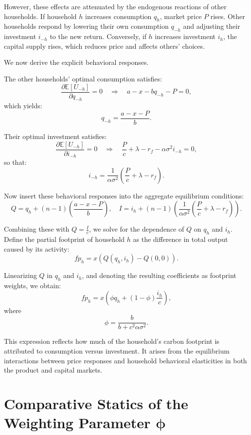 \documentclass[12pt,a4paper]{article}%
\begin{document}
However, these effects are attenuated by the endogenous reactions of other households. If household \( h \) increases consumption \( q_h \), market price \( P \) rises. Other households respond by lowering their own consumption \( q_{-h} \) and adjusting their investment \( i_{-h} \) to the new return. Conversely, if \( h \) increases investment \( i_h \), the capital supply rises, which reduces price and affects others' choices.

We now derive the explicit behavioral responses.

The other households' optimal consumption satisfies:
\[
\frac{\partial \mathbb{E}[U_{-h}]}{\partial q_{-h}} = 0 \quad \Rightarrow \quad a - x - b q_{-h} - P = 0,
\]
which yields:
\[
q_{-h} = \frac{a - x - P}{b}.
\]

Their optimal investment satisfies:
\[
\frac{\partial \mathbb{E}[U_{-h}]}{\partial i_{-h}} = 0 \quad \Rightarrow \quad \frac{P}{c} + \lambda - r_f - \alpha \sigma^2 i_{-h} = 0,
\]
so that:
\[
i_{-h} = \frac{1}{\alpha \sigma^2} \left( \frac{P}{c} + \lambda - r_f \right).
\]

Now insert these behavioral responses into the aggregate equilibrium conditions:
\[
Q = q_h + (n - 1) \left( \frac{a - x - P}{b} \right), \quad I = i_h + (n - 1) \left( \frac{1}{\alpha \sigma^2} \left( \frac{P}{c} + \lambda - r_f \right) \right).
\]

Combining these with \( Q = \frac{I}{c} \), we solve for the dependence of \( Q \) on \( q_h \) and \( i_h \). Define the partial footprint of household \( h \) as the difference in total output caused by its activity:
\[
fp_h = x \left( Q(q_h, i_h) - Q(0, 0) \right).
\]

Linearizing \( Q \) in \( q_h \) and \( i_h \), and denoting the resulting coefficients as footprint weights, we obtain:
\[
fp_h = x \left( \phi q_h + (1 - \phi) \frac{i_h}{c} \right),
\]
where
\[
\phi = \frac{b}{b + c^2 \alpha \sigma^2}.
\]

This expression reflects how much of the household’s carbon footprint is attributed to consumption versus investment. It arises from the equilibrium interactions between price responses and household behavioral elasticities in both the product and capital markets.

\section{Comparative Statics of the Weighting Parameter \( \boldsymbol{\phi} \)}
\end{document}
